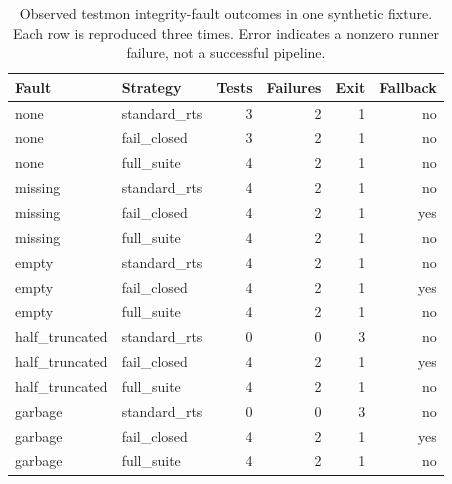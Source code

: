 \begin{table}[t]
\centering
\caption{Observed testmon integrity-fault outcomes in one synthetic fixture. Each row is reproduced three times. Error indicates a nonzero runner failure, not a successful pipeline.}
\label{tab:testmon-integrity-pilot}
\begin{tabular}{llrrrr}
\hline
Fault & Strategy & Tests & Failures & Exit & Fallback \\
\hline
none & standard\_rts & 3 & 2 & 1 & no \\
none & fail\_closed & 3 & 2 & 1 & no \\
none & full\_suite & 4 & 2 & 1 & no \\
missing & standard\_rts & 4 & 2 & 1 & no \\
missing & fail\_closed & 4 & 2 & 1 & yes \\
missing & full\_suite & 4 & 2 & 1 & no \\
empty & standard\_rts & 4 & 2 & 1 & no \\
empty & fail\_closed & 4 & 2 & 1 & yes \\
empty & full\_suite & 4 & 2 & 1 & no \\
half\_truncated & standard\_rts & 0 & 0 & 3 & no \\
half\_truncated & fail\_closed & 4 & 2 & 1 & yes \\
half\_truncated & full\_suite & 4 & 2 & 1 & no \\
garbage & standard\_rts & 0 & 0 & 3 & no \\
garbage & fail\_closed & 4 & 2 & 1 & yes \\
garbage & full\_suite & 4 & 2 & 1 & no \\
\hline
\end{tabular}
\end{table}

